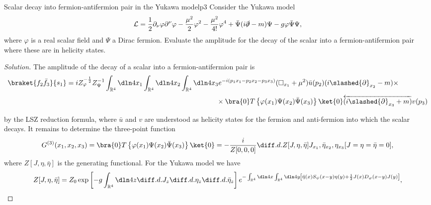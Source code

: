 \begin{problem}{Scalar decay into fermion-antifermion pair in the Yukawa model}{p3}
   Consider the Yukawa model
   \begin{equation*}
      \mathcal{L} = \frac12 \partial_\nu \varphi \partial^\nu \varphi - \frac{\mu^2}{2} \varphi^2 - \frac{\mu^2}{4!} \varphi^4 + \bar{\Psi} (i \slashed{\partial} - m) \Psi - g \varphi \bar{\Psi} \Psi,
   \end{equation*}
   where \(\varphi\) is a real scalar field and \(\Psi\) a Dirac fermion. Evaluate the amplitude for the decay of the scalar into a fermion-antifermion pair where these are in helicity states.
\end{problem}
\begin{proof}[Solution]
   The amplitude of the decay of a scalar into a fermion-antifermion pair is
   \begin{align*}
      \braket{f_2 \bar{f}_3}{s_1} &= iZ_\varphi^{-\frac12} Z_\Psi^{-1} \int_{\mathbb{R}^4} \dln4{x_1} \int_{\mathbb{R}^4} \dln4{x_2} \int_{\mathbb{R}^4} \dln4{x_3} e^{-i(p_1 x_1 - p_2 x_2 - p_3 x_3)} (\square_{x_1} + \mu^2) \bar{u}(p_2) (i \slashed{\partial}_{x_2} - m) \times\\
                                  &{}\phantom{= iZ_\varphi^{-\frac12} Z_\psi^{-1}\int_{\mathbb{R}^4} \dln4{x_1}\int_{\mathbb{R}^4} \dln4{x_2}\int_{\mathbb{R}^4} \dln4{x_3}} \times \bra{0} T\left\{\varphi(x_1) \Psi(x_2) \bar{\Psi}(x_3)\right\}\ket{0} \overleftarrow{(i \slashed{\partial}_{x_3} + m)} v(p_3)
   \end{align*}
   by the LSZ reduction formula, where \(\bar{u}\) and \(v\) are understood as helicity states for the fermion and anti-fermion into which the scalar decays. It remains to determine the three-point function
   \begin{equation*}
      G^{(3)}(x_1, x_2, x_3) = \bra{0} T\left\{\varphi(x_1) \Psi(x_2) \bar{\Psi}(x_3)\right\}\ket{0} = -\frac{i}{Z[0,0,0]} \diff.d.{Z[J, \eta, \bar{\eta}]}{J_{x_1},\bar{\eta}_{x_2},\eta_{x_3}}[J = \eta = \bar{\eta} = 0],
   \end{equation*}
   where \(Z[J, \eta, \bar{\eta}]\) is the generating functional. For the Yukawa model we have
   \begin{equation*}
      Z[J,\eta,\bar{\eta}] = Z_0\exp\left[-g \int_{\mathbb{R}^4} \dln4z \diff.d.{}{J_z} \diff.d.{}{\eta_z} \diff.d.{}{\bar{\eta}_z}\right]e^{-\int_{\mathbb{R}^4} \dln4x \int_{\mathbb{R}^4} \dln4y \left[\bar{\eta}(x) S_\psi(x - y) \eta(y) + \frac12 J(x) D_\varphi(x - y) J(y)\right]},

\end{equation*}
\end{proof}
